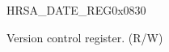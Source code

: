 \begin{register}{H}{RSA\_DATE\_REG}{0x0830}\label{regdesc:RSADATEREG}
%
%
\regnewline%
\begin{regdesc}\begin{reglist}
\label{fielddesc:RSADATE}\item [RSA\_DATE] Version control register. (R/W)
\end{reglist}\end{regdesc}
\end{register}


